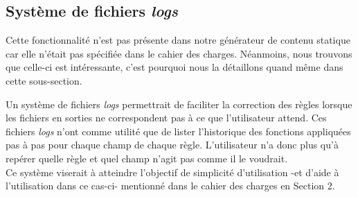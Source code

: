 	\subsection{Système de fichiers \textit{logs}}
	
		\begin{note}
			Cette fonctionnalité n'est pas présente dans notre générateur de contenu statique car elle n'était pas spécifiée dans le cahier des charges. Néanmoins, nous trouvons que celle-ci est intéressante, c'est pourquoi nous la détaillons quand même dans cette sous-section.
		\end{note}
	
		Un système de fichiers \textit{logs} permettrait de faciliter la correction des règles lorsque les fichiers en sorties ne correspondent pas à ce que l'utilisateur attend. Ces fichiers \textit{logs} n'ont comme utilité que de lister l'historique des fonctions appliquées pas à pas pour chaque champ de chaque règle. L'utilisateur n'a donc plus qu'à repérer quelle règle et quel champ n'agit pas comme il le voudrait.\\
		
		Ce système viserait à atteindre l'objectif de simplicité d'utilisation -et d'aide à l'utilisation dans ce cas-ci- mentionné dans le cahier des charges en Section 2.
		
		